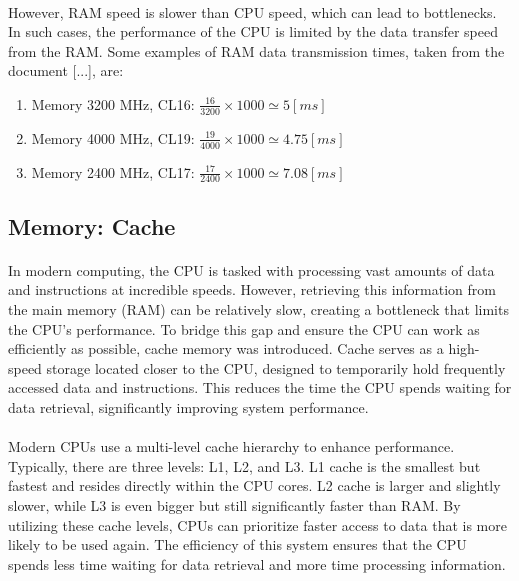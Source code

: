     \paragraph*{}
    However, RAM speed is slower than CPU speed, which can lead to bottlenecks. In such cases, the performance of 
    the CPU is limited by the data transfer speed from the RAM. Some examples of RAM data transmission times, 
    taken from the document [...], are:
    \begin{enumerate}
        \item Memory 3200 MHz, CL16: $\frac{16}{3200} \times 1000 \simeq 5 [ms]$
        \item Memory 4000 MHz, CL19: $\frac{19}{4000} \times 1000 \simeq 4.75 [ms]$
        \item  Memory 2400 MHz, CL17: $\frac{17}{2400} \times 1000 \simeq 7.08 [ms]$
    \end{enumerate}
    
    
   

\subsection{Memory: Cache}

    \paragraph*{}
    In modern computing, the CPU is tasked with processing vast amounts of data and instructions at incredible speeds. 
    However, retrieving this information from the main memory (RAM) can be relatively slow, creating a bottleneck that 
    limits the CPU's performance. To bridge this gap and ensure the CPU can work as efficiently as possible, cache 
    memory was introduced. Cache serves as a high-speed storage located closer to the CPU, designed to temporarily 
    hold frequently accessed data and instructions. This reduces the time the CPU spends waiting for data retrieval, 
    significantly improving system performance.
    \par

    \paragraph*{}
    Modern CPUs use a multi-level cache hierarchy to enhance performance. Typically, there are three levels: L1, L2, 
    and L3. L1 cache is the smallest but fastest and resides directly within the CPU cores. L2 cache is larger and 
    slightly slower, while L3 is even bigger but still significantly faster than RAM. By utilizing these cache 
    levels, CPUs can prioritize faster access to data that is more likely to be used again. The efficiency of 
    this system ensures that the CPU spends less time waiting for data retrieval and more time processing information.
    \par

